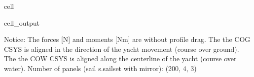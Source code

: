 \documentclass[a4paper,12pt,english]{jupyterBook}
\begin{document}
\begin{sphinxuseclass}{cell}
\begin{sphinxVerbatimOutput}
\begin{sphinxuseclass}{cell_output}
\begin{sphinxVerbatim}[commandchars=\\\{\}]
\PYGZhy{}\PYGZhy{}\PYGZhy{}\PYGZhy{}\PYGZhy{}\PYGZhy{}\PYGZhy{}\PYGZhy{}\PYGZhy{}\PYGZhy{}\PYGZhy{}\PYGZhy{}\PYGZhy{}\PYGZhy{}\PYGZhy{}\PYGZhy{}\PYGZhy{}\PYGZhy{}\PYGZhy{}\PYGZhy{}\PYGZhy{}\PYGZhy{}\PYGZhy{}\PYGZhy{}\PYGZhy{}\PYGZhy{}\PYGZhy{}\PYGZhy{}\PYGZhy{}\PYGZhy{}\PYGZhy{}\PYGZhy{}\PYGZhy{}\PYGZhy{}\PYGZhy{}\PYGZhy{}\PYGZhy{}\PYGZhy{}\PYGZhy{}\PYGZhy{}\PYGZhy{}\PYGZhy{}\PYGZhy{}\PYGZhy{}\PYGZhy{}\PYGZhy{}\PYGZhy{}\PYGZhy{}\PYGZhy{}\PYGZhy{}\PYGZhy{}\PYGZhy{}\PYGZhy{}\PYGZhy{}\PYGZhy{}\PYGZhy{}\PYGZhy{}\PYGZhy{}\PYGZhy{}\PYGZhy{}\PYGZhy{}
Notice:
	The forces [N] and moments [Nm] are without profile drag.
	The the \PYGZus{}COG\PYGZus{} CSYS is aligned in the direction of the yacht movement (course over ground).
	The the \PYGZus{}COW\PYGZus{} CSYS is aligned along the centerline of the yacht (course over water).
	Number of panels (sail s.sail\PYGZus{}set with mirror): (200, 4, 3)
\end{sphinxVerbatim}


\end{sphinxuseclass}
\end{sphinxVerbatimOutput}
\end{sphinxuseclass}
\end{document}
